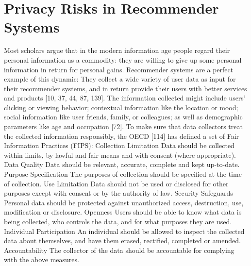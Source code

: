 \section{Privacy Risks in Recommender Systems}
Most scholars argue that in the modern information age people regard their personal information as a commodity: they are willing to give up some personal information in return for personal gains. Recommender systems are a perfect example of this dynamic: They collect a wide variety of user data as input for their recommender systems, and in return provide their users with better services and products [10, 37, 44, 87, 139]. The information collected might include users’ clicking or viewing behavior; contextual information like the location or mood; social information like user friends, family, or colleagues; as well as demographic parameters like age and occupation [72]. To make sure that data collectors treat the collected information responsibly, the OECD [114] has defined a set of Fair Information Practices (FIPS): Collection Limitation Data should be collected within limits, by lawful and fair means and with consent (where appropriate). Data Quality Data should be relevant, accurate, complete and kept up-to-date. Purpose Specification The purposes of collection should be specified at the time of collection. Use Limitation Data should not be used or disclosed for other purposes except with consent or by the authority of law. Security Safeguards Personal data should be protected against unauthorized access, destruction, use, modification or disclosure. Openness Users should be able to know what data is being collected, who controls the data, and for what purposes they are used. Individual Participation An individual should be allowed to inspect the collected data about themselves, and have them erased, rectified, completed or amended. Accountability The collector of the data should be accountable for complying with the above measures.
